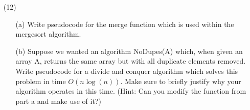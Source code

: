\documentclass[12pt]{article}
\begin{document}
\begin{enumerate}
    \newpage
    \item[(12)] 
    \begin{itemize}
        \item[(a)] Write pseudocode for the merge function which is used within the mergesort algorithm. \vspace{8cm}
        \item[(b)] Suppose we wanted an algorithm NoDupes(A) which, when given an array A, returns the same array but with all duplicate elements removed. Write pseudocode for a divide and conquer algorithm which solves this problem in time $O(n\log(n))$. Make sure to briefly justify why your algorithm operates in this time. (Hint: Can you modify the function from part a and make use of it?) \vspace{7cm}
    \end{itemize}


\end{enumerate}
\end{document}
